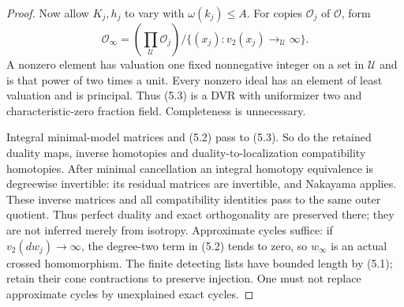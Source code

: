 \documentclass[11pt]{article}
\theoremstyle{definition}
\theoremstyle{remark}
\providecommand{\mathscr}[1]{\mathcal{#1}}
\begin{document}
\begin{proof}
Now allow $K_j,h_j$ to vary with $\omega(k_j)\le A$.
For copies $\mathscr O_j$ of $\mathscr O$, form
\[
 \mathscr O_\infty=
 \left(\prod_{\mathcal U}\mathscr O_j\right)/
 \{(x_j):v_2(x_j)\to_{\mathcal U}\infty\}.                         \tag{5.3}
\]
A nonzero element has valuation one fixed nonnegative integer on a
set in $\mathcal U$ and is that power of two times a unit.
Every nonzero ideal has an element of least valuation and is
principal. Thus (5.3) is a DVR with uniformizer two and characteristic-zero
fraction field. Completeness is unnecessary.

Integral minimal-model matrices and (5.2) pass to (5.3).
So do the retained duality maps, inverse homotopies and
duality-to-localization compatibility homotopies. After minimal
cancellation an integral homotopy equivalence is degreewise invertible:
its residual matrices are invertible, and Nakayama applies.
These inverse matrices and all compatibility identities pass to the
same outer quotient. Thus perfect duality and exact orthogonality
are preserved there; they are not inferred merely from isotropy.
Approximate cycles suffice: if $v_2(dw_j)\to\infty$, the degree-two
term in (5.2) tends to zero, so $w_\infty$ is an actual crossed
homomorphism. The finite detecting lists have bounded length by
(5.1); retain their cone contractions to preserve injection.
One must not replace approximate cycles by unexplained exact cycles.
\end{proof}
\end{document}
